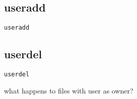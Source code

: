 
\subsection{useradd}

\begin{verbatim}
useradd
\end{verbatim}

\subsection{userdel}

\begin{verbatim}
userdel
\end{verbatim}

what happens to files with user as owner?
